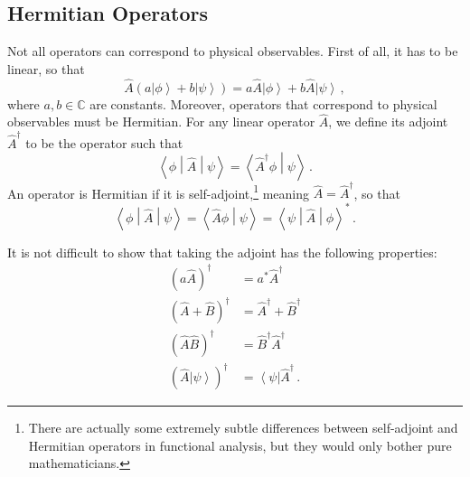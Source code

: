 \documentclass{article}
\theoremstyle{plain}\theoremheaderfont{\normalfont\itshape}\theorembodyfont{\rmfamily}\theoremseparator{.}\newtheorem*{rem}{Remark}\newtheorem*{ex}{Example}\newtheorem*{proof}{Proof}\newtheorem*{altp}{Alternative proof}
\theoremstyle{plain}\theoremheaderfont{\normalfont\bfseries}\theorembodyfont{\rmfamily}\theoremseparator{.}\newtheorem{thm}{Theorem}[section]\newtheorem{lem}[thm]{Lemma}\newtheorem{prop}[thm]{Proposition}\newtheorem*{cor}{Corollary}\newtheorem{defn}[thm]{Definition}\newtheorem{clm}[thm]{Claim}\newtheorem{clminproof}{Claim}
\theoremstyle{break}\theoremheaderfont{\normalfont\itshape}\theorembodyfont{\rmfamily}\theoremseparator{.\medskip}\newtheorem*{proofskip}{Proof}\newtheorem*{exs}{Examples}\newtheorem*{rems}{Remarks}
\theoremstyle{break}\theoremheaderfont{\normalfont\bfseries}\theorembodyfont{\rmfamily}\theoremseparator{.\medskip}\newtheorem{lemskip}[thm]{Lemma}\newtheorem{defnskip}[thm]{Definition}\newtheorem{propskip}[thm]{Proposition}\newtheorem{thmskip}[thm]{Theorem}
\numberwithin{equation}{section}
\newcommand{\bra}[1]{\left\langle #1 \right|}
\newcommand{\ket}[1]{\left| #1 \right\rangle}
\newcommand{\braket}[2]{\left\langle #1 \middle| #2 \right\rangle}
\newcommand{\mel}[3]{\left\langle #1 \middle| #2 \middle| #3 \right\rangle}
\newcommand{\CC}{\mathbb{C}}
\begin{document}
    \subsection{Hermitian Operators}
    Not all operators can correspond to physical observables. First of all, it has to be linear, so that
    \begin{equation}
        \hat{A}(a\ket{\phi}+b\ket{\psi})=a\hat{A}\ket{\phi}+b\hat{A}\ket{\psi}\,,
    \end{equation}
    where \(a,b\in\CC\) are constants. Moreover, operators that correspond to physical observables must be Hermitian. For any linear operator \(\hat{A}\), we define its adjoint \(\hat{A}^\dagger\) to be the operator such that
    \begin{equation}
        \mel{\phi}{\hat{A}}{\psi}=\braket{\hat{A}^\dagger\phi}{\psi}\,.
    \end{equation}
    An operator is Hermitian if it is self-adjoint,\footnote{There are actually some extremely subtle differences between self-adjoint and Hermitian operators in functional analysis, but they would only bother pure mathematicians.} meaning \(\hat{A}=\hat{A}^\dagger\), so that
    \begin{equation}
        \mel{\phi}{\hat{A}}{\psi}=\braket{\hat{A}\phi}{\psi}=\mel{\psi}{\hat{A}}{\phi}^*\,.
    \end{equation}

    It is not difficult to show that taking the adjoint has the following properties:
    \begin{align}
        (a\hat{A})^\dagger&=a^*\hat{A}^\dagger \\
        (\hat{A}+\hat{B})^\dagger&=\hat{A}^\dagger+\hat{B}^\dagger \\
        (\hat{A}\hat{B})^\dagger&=\hat{B}^\dagger\hat{A}^\dagger \\
        (\hat{A}\ket{\psi})^\dagger&=\bra{\psi}\hat{A}^\dagger\,.
    \end{align}
\end{document}

